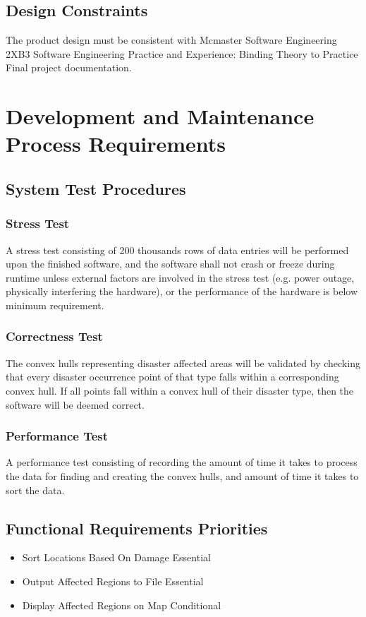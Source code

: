 \documentclass{article}
\begin{document}
    \subsection{Design Constraints}
    The product design must be consistent with Mcmaster Software Engineering 
    2XB3 Software Engineering Practice and Experience: Binding Theory to Practice 
    Final project documentation.
    
    \section{Development and Maintenance Process Requirements}
    \subsection{System Test Procedures}
    \subsubsection{Stress Test}
    A stress test consisting of 200 thousands rows of data entries will be 
    performed upon the finished software, and the software shall not crash 
    or freeze during runtime unless external factors are involved in the 
    stress test (e.g. power outage, physically interfering the hardware),
    or the performance of the hardware is below minimum requirement.

    \subsubsection{Correctness Test}
    The convex hulls representing disaster affected areas will be validated 
    by checking that every disaster occurrence point of that type falls within a 
    corresponding convex hull. If all points fall within a convex hull of their 
    disaster type, then the software will be deemed correct.

    \subsubsection {Performance Test}
    A performance test consisting of recording the amount of time it takes to 
    process the data for finding and creating the convex hulls, and amount of 
    time it takes to sort the data.
        \subsection{Functional Requirements Priorities}
        \begin{itemize}
            \item{Sort Locations Based On Damage} Essential
            \item{Output Affected Regions to File} Essential
            \item{Display Affected Regions on Map} Conditional
        \end{itemize}
\end{document}
